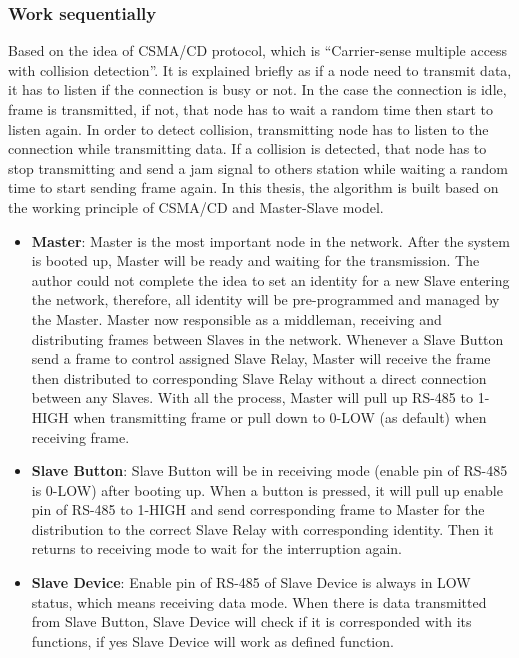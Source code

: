 \subsubsection{Work sequentially}
Based on the idea of CSMA/CD protocol, which is “Carrier-sense multiple access with collision detection”. It is explained briefly as if a node need to transmit data, it has to listen if the connection is busy or not. In the case the connection is idle, frame is transmitted, if not, that node has to wait a random time then start to listen again. In order to detect collision, transmitting node has to listen to the connection while transmitting data. If a collision is detected, that node has to stop transmitting and send a jam signal to others station while waiting a random time to start sending frame again.
In this thesis, the algorithm is built based on the working principle of CSMA/CD and Master-Slave model.
    \begin{itemize}
    \item \textbf{Master}: Master is the most important node in the network. After the system is booted up, Master will be ready and waiting for the transmission. The author could not complete the idea to set an identity for a new Slave entering the network, therefore, all identity will be pre-programmed and managed by the Master. Master now responsible as a middleman, receiving and distributing frames between Slaves in the network. Whenever a Slave Button send a frame to control assigned Slave Relay, Master will receive the frame then distributed to corresponding Slave Relay without a direct connection between any Slaves. With all the process, Master will pull up RS-485 to 1-HIGH when transmitting frame or pull down to 0-LOW (as default) when receiving frame.
    \item \textbf{Slave Button}: Slave Button will be in receiving mode (enable pin of RS-485 is 0-LOW) after booting up. When a button is pressed, it will pull up enable pin of RS-485 to 1-HIGH and send corresponding frame to Master for the distribution to the correct Slave Relay with corresponding identity. Then it returns to receiving mode to wait for the interruption again.
    \item \textbf{Slave Device}: Enable pin of RS-485 of Slave Device is always in LOW status, which means receiving data mode. When there is data transmitted from Slave Button, Slave Device will check if it is corresponded with its functions, if yes Slave Device will work as defined function.
    \end{itemize}


